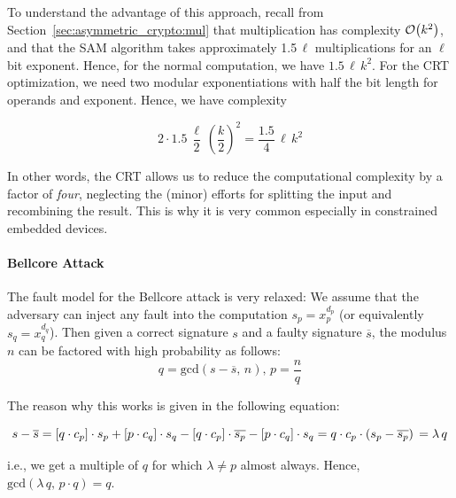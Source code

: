 To understand the advantage of this approach, recall from Section~\ref{sec:asymmetric_crypto:mul} that multiplication has complexity $\mathcal{O}{\left(k^2\right)}$, and that the \ac{SAM} algorithm takes approximately 1.5\,$\ell$ multiplications for an $\ell$ bit exponent. Hence, for the normal computation, we have $1.5\, \ell\,k^2$. For the \ac{CRT} optimization, we need two modular exponentiations with half the bit length for operands and exponent. Hence, we have complexity

$$2 \cdot 1.5\, \frac{\ell}{2}\,\left(\frac{k}{2}\right)^2 = \frac{1.5}{4}\,\ell\,k^2$$

In other words, the \ac{CRT} allows us to reduce the computational complexity by a factor of \emph{four}, neglecting the (minor) efforts for splitting the input and recombining the result. This is why it is very common especially in constrained embedded devices.

\paragraph{Bellcore Attack}
The fault model for the Bellcore attack is very relaxed: We assume that the adversary can inject any fault into the computation $s_p = x_p^{d_p}$ (or equivalently $s_q = x_q^{d_q}$). Then given a correct signature $s$ and a faulty signature $\overline{s}$, the modulus $n$ can be factored with high probability as follows:
$$
q = \mbox{gcd}\left(s - \overline{s},\,n\right),\, p = \frac{n}{q}
$$

The reason why this works is given in the following equation:

$$
s - \overline{s} = \left[q \cdot c_p\right] \cdot s_p + \left[p \cdot c_q\right] \cdot s_q - \left[q \cdot c_p\right] \cdot \overline{s_p} - \left[p \cdot c_q\right] \cdot s_q = q \cdot c_p \cdot \left(s_p - \overline{s_p} \right) \nonumber\\
                 = \lambda\,q
$$

i.e., we get a multiple of $q$ for which $\lambda \neq p$ almost always. Hence, $\mbox{gcd}\left(\lambda\,q,\,p \cdot q\right) = q$.

